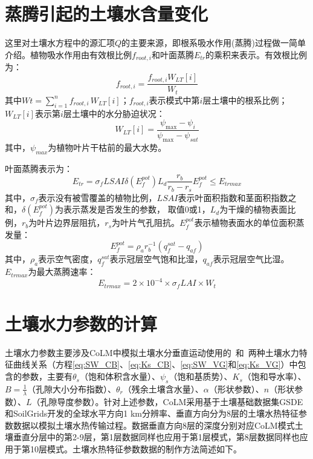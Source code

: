 \section{蒸腾引起的土壤水含量变化}

这里对土壤水方程中的源汇项$Q$的主要来源，即根系吸水作用(蒸腾)过程做一简单介绍。植物吸水作用由有效根比例$f_{root,i}$和叶面蒸腾$E_{tr}$的乘积来表示\citep{dai2003common}。有效根比例为：
\begin{equation}
{f}_{ {root }, {i}}=\frac{{f}_{{root}, {i}} {W}_{{LT}}[{i}]}{W_{t}}
\end{equation}
其中$Wt = \sum_{i=1}^{n}{f_{root,i\ }W_{LT}\left[i\right]}$；$f_{root,i}$表示模式中第$i$层土壤中的根系比例；$W_{LT}[i]$表示第$i$层土壤中的水分胁迫状况：
\begin{equation}
{W}_{{LT}}[{i}]=\frac{\psi_{\max }-\psi_{i}}{\psi_{\max }-\psi_{sat}}
\end{equation}
其中，$\psi_{max}$为植物叶片干枯前的最大水势。

叶面蒸腾表示为：
\begin{equation}
{E}_{{tr}}=\sigma_{{f}} LSAI \delta\left({E}_{{f}}^{{pot}}\right) {L}_{{d}} \frac{{r}_{{b}}}{{r}_{{b}}-{r}_{{s}}} {E}_{{f}}^{{pot}} \leqslant {E}_{{trmax}}
\end{equation}
其中，$\sigma_f$表示没有被雪覆盖的植物比例，$LSAI$表示叶面积指数和茎面积指数之和，$\delta\left(E_f^{pot}\right)$为表示蒸发是否发生的参数，
取值0或1，$L_d$为干燥的植物表面比例，$r_b$为叶片边界层阻抗，$r_s$为叶片气孔阻抗。$E_f^{pot}$表示植物表面水的单位面积蒸发量：
\begin{equation}
{E}_{{f}}^{{pot}}=\rho_{{a}} {r}_{{b}}^{-1}\left({q}_{{f}}^{{sat}}-{q}_{{af}}\right)
\end{equation}
其中，$\rho_a$表示空气密度，$q_f^{sat}$表示冠层空气饱和比湿，$q_{af}$表示冠层空气比湿。$E_{trmax}$为最大蒸腾速率：
\begin{equation}
{E}_{ {trmax }}=2 \times 10^{-4} \times \sigma_{{f}} L A I \times W_{t}
\end{equation}

\section{土壤水力参数的计算}\label{sec_hydropar}
土壤水力参数主要涉及CoLM中模拟土壤水分垂直运动使用的~\citet{campbell1974}和~\citet{van1980closed}两种土壤水力特征曲线关系（方程\eqref{eq:SW_CB}、\eqref{eq:Ks_CB}、\eqref{eq:SW_VG}和\eqref{eq:Ks_VG}）中包含的参数，主要有$\theta_s$（饱和体积含水量）、$\psi_s$（饱和基质势）、$K_s$（饱和导水率）、$B=\frac{1}{\lambda}$（孔隙大小分布指数）、$\theta_r$（残余土壤含水量）、$\alpha$（形状参数）、$n$（形状参数）、$L$（孔隙导度参数）。针对上述参数，CoLM采用基于土壤基础数据集GSDE和SoilGrids开发的全球水平方向1 km分辨率、垂直方向分为8层的土壤水热特征参数数据以模拟土壤水热传输过程。数据垂直方向8层的深度分别对应CoLM模式土壤垂直分层中的第2-9层，第1层数据同样也应用于第1层模式，第8层数据同样也应用于第10层模式。土壤水热特征参数数据的制作方法简述如下。

